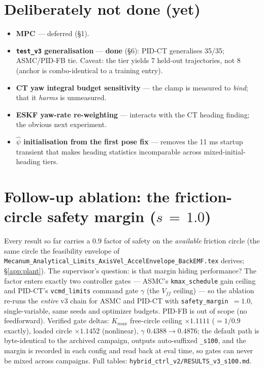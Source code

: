 \documentclass[11pt]{article}
\begin{document}
\section{Deliberately not done (yet)}
\begin{itemize}[nosep]
\item \textbf{MPC} --- deferred (\S1).
\item \textbf{\texttt{test\_v3} generalisation} --- \textbf{done} (\S6): PID-CT
      generalises 35/35; ASMC/PID-FB tie. Caveat: the tier yields 7 held-out
      trajectories, not 8 (anchor is combo-identical to a training entry).
\item \textbf{CT yaw integral budget sensitivity} --- the clamp is measured to
      \emph{bind}; that it \emph{harms} is unmeasured.
\item \textbf{ESKF yaw-rate re-weighting} --- interacts with the CT heading finding; the
      obvious next experiment.
\item \textbf{$\hat\psi$ initialisation from the first pose fix} --- removes the 11 ms
      startup transient that makes heading statistics incomparable across
      mixed-initial-heading tiers.
\end{itemize}

\section{Follow-up ablation: the friction-circle safety margin ($s\,{=}\,1.0$)}
\label{sec:s100}

Every result so far carries a $0.9$ factor of safety on the \emph{available} friction
circle (the same circle the feasibility envelope of
\texttt{Mecanum\_Analytical\_Limits\_AxisVel\_AccelEnvelope\_BackEMF.tex} derives;
\S\ref{app:plant}). The supervisor's question: is that margin hiding
performance? The factor enters exactly two controller gates --- ASMC's
\texttt{kmax\_schedule} gain ceiling and PID-CT's \texttt{vcmd\_limits} command gate
$\gamma$ (the $V_{ff}$ ceiling) --- so the ablation re-runs the \emph{entire} v3 chain
for ASMC and PID-CT with \texttt{safety\_margin}~$=1.0$, single-variable, same seeds
and optimizer budgets. PID-FB is out of scope (no feedforward). Verified gate deltas:
$K_{max}$ free-circle ceiling $\times 1.1111$ ($=1/0.9$ exactly), loaded circle
$\times 1.1452$ (nonlinear), $\gamma$ $0.4388\to0.4876$; the default path is
byte-identical to the archived campaign, outputs auto-suffixed \texttt{\_s100}, and the
margin is recorded in each config and read back at eval time, so gates can never be
mixed across campaigns. Full tables: \texttt{hybrid\_ctrl\_v2/RESULTS\_v3\_s100.md}.
\end{document}
